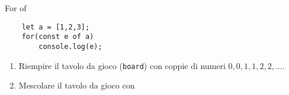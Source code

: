 \begin{frame}[fragile]{For of}\transfade\centering
\begin{verbatim}
    let a = [1,2,3];
    for(const e of a)
        console.log(e);
\end{verbatim}
\end{frame}


\begin{frame}[fragile]\transfade
  \begin{exercise}\centering
    \begin{enumerate}
      \item Riempire il tavolo da gioco (\texttt{board}) con coppie di numeri $0,0,1,1,2,2,\dots$.
      \item Mescolare il tavolo da gioco con
      \begin{algorithm}[H]\normalfont\small
      \end{algorithm}
    \end{enumerate}
  \end{exercise}
\end{frame}

